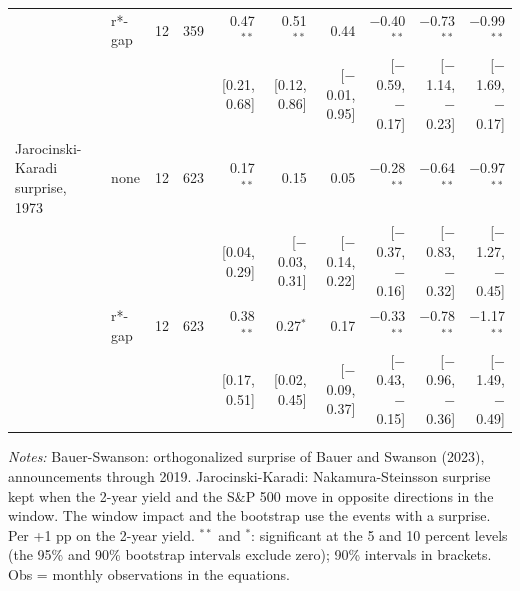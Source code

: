 \begin{table}[tp]
{\begin{tabular}{llcrrrrrrr}
 & r*-gap & 12 & 359 & 0.47$^{**}$ & 0.51$^{**}$ & 0.44 & $-$0.40$^{**}$ & $-$0.73$^{**}$ & $-$0.99$^{**}$\\
 & & & & {\scriptsize [0.21, 0.68]} & {\scriptsize [0.12, 0.86]} & {\scriptsize [$-$0.01, 0.95]} & {\scriptsize [$-$0.59, $-$0.17]} & {\scriptsize [$-$1.14, $-$0.23]} & {\scriptsize [$-$1.69, $-$0.17]}\\
\addlinespace
Jarocinski-Karadi surprise, 1973 & none & 12 & 623 & 0.17$^{**}$ & 0.15 & 0.05 & $-$0.28$^{**}$ & $-$0.64$^{**}$ & $-$0.97$^{**}$\\
 & & & & {\scriptsize [0.04, 0.29]} & {\scriptsize [$-$0.03, 0.31]} & {\scriptsize [$-$0.14, 0.22]} & {\scriptsize [$-$0.37, $-$0.16]} & {\scriptsize [$-$0.83, $-$0.32]} & {\scriptsize [$-$1.27, $-$0.45]}\\
 & r*-gap & 12 & 623 & 0.38$^{**}$ & 0.27$^{*}$ & 0.17 & $-$0.33$^{**}$ & $-$0.78$^{**}$ & $-$1.17$^{**}$\\
 & & & & {\scriptsize [0.17, 0.51]} & {\scriptsize [0.02, 0.45]} & {\scriptsize [$-$0.09, 0.37]} & {\scriptsize [$-$0.43, $-$0.15]} & {\scriptsize [$-$0.96, $-$0.36]} & {\scriptsize [$-$1.49, $-$0.49]}\\
\bottomrule\end{tabular}}
\begin{flushleft}\footnotesize\textit{Notes:} Bauer-Swanson: orthogonalized surprise of Bauer and Swanson (2023), announcements through 2019. Jarocinski-Karadi: Nakamura-Steinsson surprise kept when the 2-year yield and the S\&P 500 move in opposite directions in the window. The window impact and the bootstrap use the events with a surprise. Per +1 pp on the 2-year yield. $^{**}$ and $^{*}$: significant at the 5 and 10 percent levels (the 95\% and 90\% bootstrap intervals exclude zero); 90\% intervals in brackets. Obs = monthly observations in the equations.\end{flushleft}
\end{table}
